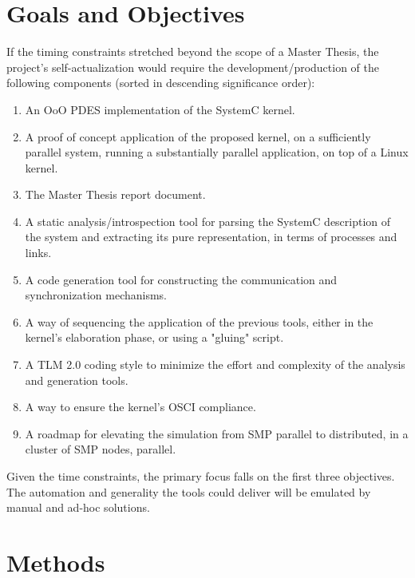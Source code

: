 \documentclass[12pt,twoside]{article}
\begin{document}
\section{Goals and Objectives}
\label{sec:orgheadline13}
If the timing constraints stretched beyond the scope of a Master Thesis, 
the project's self-actualization would require the development/production of the following components (sorted in descending significance order):
\begin{enumerate}
\item An OoO PDES implementation of the SystemC kernel.
\item A proof of concept application of the proposed kernel, on a sufficiently parallel system, running a substantially parallel application, on top of a Linux kernel.
\item The Master Thesis report document.
\item A static analysis/introspection tool for parsing the SystemC description of the system and extracting its pure representation, in terms of processes and links.
\item A code generation tool for constructing the communication and synchronization mechanisms.
\item A way of sequencing the application of the previous tools, either in the kernel's elaboration phase, or using a "gluing" script.
\item A TLM 2.0 coding style to minimize the effort and complexity of the analysis and generation tools.
\item A way to ensure the kernel's OSCI compliance.
\item A roadmap for elevating the simulation from SMP parallel to distributed, in a cluster of SMP nodes, parallel.
\end{enumerate}

Given the time constraints, the primary focus falls on the first three objectives.
The automation and generality the tools could deliver will be emulated by manual and ad-hoc solutions.







\section{Methods}
\label{sec:orgheadline19}
\end{document}
